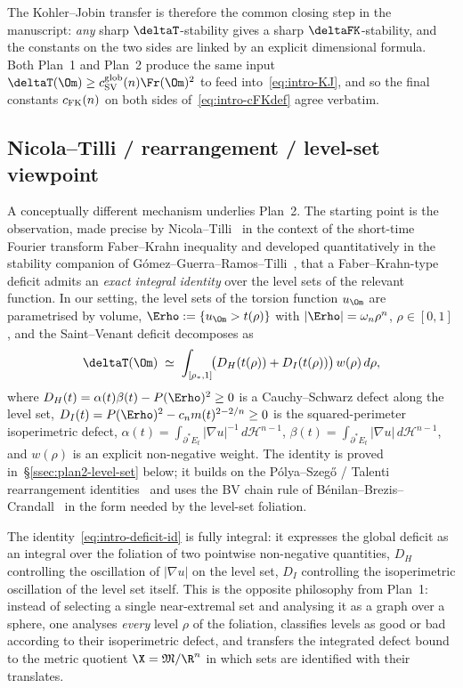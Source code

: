 The Kohler--Jobin transfer is therefore the common closing step in
the manuscript: \emph{any} sharp $\deltaT$-stability gives a sharp
$\deltaFK$-stability, and the constants on the two sides are linked
by an explicit dimensional formula. Both Plan~1 and Plan~2 produce
the same input $\deltaT(\Om)\ge c_{\rm SV}^{\rm glob}(n)\Fr(\Om)^2$ to
feed into~\eqref{eq:intro-KJ}, and so the final constants
$c_{\rm FK}(n)$ on both sides
of~\eqref{eq:intro-cFKdef} agree verbatim.

\subsection{Nicola--Tilli / rearrangement / level-set viewpoint}
\label{ssec:intro-nt}

A conceptually different mechanism underlies Plan~2. The starting
point is the observation, made precise by
Nicola--Tilli~\cite{NicolaTilli2022} in the context of the
short-time Fourier transform Faber--Krahn inequality and developed
quantitatively in the stability companion of
Gómez--Guerra--Ramos--Tilli~\cite{GGRT2024}, that a Faber--Krahn-type
deficit admits an \emph{exact integral identity} over the level sets
of the relevant function. In our setting, the level sets of the
torsion function $u_\Om$ are parametrised by volume,
$\Erho:=\{u_\Om>t(\rho)\}$ with $|\Erho|=\omega_n\rho^n$,
$\rho\in[0,1]$, and the Saint--Venant deficit decomposes as
\begin{equation}\label{eq:intro-deficit-id}
   \deltaT(\Om)
   \;\simeq\;
   \int_{[\rho_*,1]}\!
   \bigl(D_H(t(\rho))+D_I(t(\rho))\bigr)\,w(\rho)\,d\rho,
\end{equation}
where $D_H(t)=\alpha(t)\beta(t)-P(\Erho)^2\ge 0$ is a
Cauchy--Schwarz defect along the level set, $D_I(t)=P(\Erho)^2-c_n
m(t)^{2-2/n}\ge 0$ is the squared-perimeter isoperimetric defect,
$\alpha(t)=\int_{\partial^*E_t}|\nabla u|^{-1}\,d\mathcal H^{n-1}$,
$\beta(t)=\int_{\partial^*E_t}|\nabla u|\,d\mathcal H^{n-1}$, and
$w(\rho)$ is an explicit non-negative weight. The identity is proved
in~\S\ref{ssec:plan2-level-set} below; it builds on the
Pólya--Szeg\H o / Talenti rearrangement
identities~\cite{PolyaSzego1951,Talenti1976,KawohlBook,Bandle1980,BBC1975,BrothersZiemer1988}
and uses the BV chain rule of Bénilan--Brezis--Crandall~\cite{BBC1975}
in the form needed by the level-set foliation.

The identity~\eqref{eq:intro-deficit-id} is fully integral: it
expresses the global deficit as an integral over the foliation of
two pointwise non-negative quantities, $D_H$ controlling the
oscillation of $|\nabla u|$ on the level set, $D_I$ controlling the
isoperimetric oscillation of the level set itself. This is the
opposite philosophy from Plan~1: instead of selecting a single
near-extremal set and analysing it as a graph over a sphere, one
analyses \emph{every} level $\rho$ of the foliation, classifies
levels as good or bad according to their isoperimetric defect, and
transfers the integrated defect bound to the metric quotient
$\X=\mathfrak M/\R^n$ in which sets are identified with their
translates.

